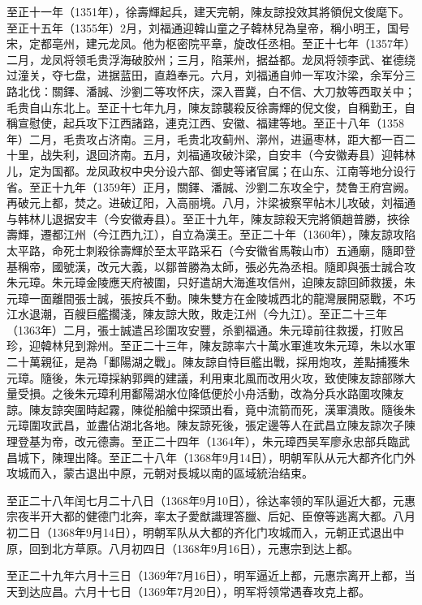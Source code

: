 至正十一年（1351年），徐壽輝起兵，建天完朝，陳友諒投效其將領倪文俊麾下。至正十五年（1355年）2月，刘福通迎韓山童之子韓林兒為皇帝，稱小明王，国号宋，定都亳州，建元龙凤。他为枢密院平章，旋改任丞相。至正十七年（1357年）二月，龙凤将领毛贵浮海破胶州；三月，陷莱州，据益都。龙凤将领李武、崔德绕过潼关，夺七盘，进据蓝田，直趋奉元。六月，刘福通自帅一军攻汴梁，余军分三路北伐：關鐸、潘誠、沙劉二等攻怀庆，深入晋冀，白不信、大刀敖等西取关中；毛贵自山东北上。至正十七年九月，陳友諒襲殺反徐壽輝的倪文俊，自稱勤王，自稱宣慰使，起兵攻下江西諸路，連克江西、安徽、福建等地。至正十八年（1358年）二月，毛贵攻占济南。三月，毛贵北攻蓟州、漷州，进逼枣林，距大都一百二十里，战失利，退回济南。五月，刘福通攻破汴梁，自安丰（今安徽寿县）迎韩林儿，定为国都。龙凤政权中央分设六部、御史等诸官属；在山东、江南等地分设行省。至正十九年（1359年）正月，關鐸、潘誠、沙劉二东攻全宁，焚鲁王府宫阙。再破元上都，焚之。进破辽阳，入高丽境。八月，汴梁被察罕帖木儿攻破，刘福通与韩林儿退据安丰（今安徽寿县）。至正十九年，陳友諒殺天完將領趙普勝，挾徐壽輝，遷都江州（今江西九江），自立為漢王。至正二十年（1360年），陳友諒攻陷太平路，命死士刺殺徐壽輝於至太平路采石（今安徽省馬鞍山市）五通廟，隨即登基稱帝，國號漢，改元大義，以鄒普勝為太師，張必先為丞相。隨即與張士誠合攻朱元璋。朱元璋金陵應天府被圍，只好遣胡大海進攻信州，迫陳友諒回師救援，朱元璋一面離間張士誠，張按兵不動。陳朱雙方在金陵城西北的龍灣展開惡戰，不巧江水退潮，百艘巨艦擱淺，陳友諒大敗，敗走江州（今九江）。至正二十三年（1363年）二月，張士誠遣呂珍圍攻安豐，杀劉福通。朱元璋前往救援，打败呂珍，迎韓林兒到滁州。至正二十三年，陳友諒率六十萬水軍進攻朱元璋，朱以水軍二十萬親征，是為「鄱陽湖之戰」。陳友諒自恃巨艦出戰，採用炮攻，差點捕獲朱元璋。隨後，朱元璋採納郭興的建議，利用東北風而改用火攻，致使陳友諒部隊大量受損。之後朱元璋利用鄱陽湖水位降低便於小舟活動，改為分兵水路圍攻陳友諒。陳友諒突圍時起霧，陳從船艙中探頭出看，竟中流箭而死，漢軍潰敗。隨後朱元璋圍攻武昌，並盡佔湖北各地。陳友諒死後，張定邊等人在武昌立陳友諒次子陳理登基为帝，改元德壽。至正二十四年（1364年），朱元璋西吴军廖永忠部兵臨武昌城下，陳理出降。至正二十八年（1368年9月14日），明朝军队从元大都齐化门外攻城而入，蒙古退出中原，元朝对長城以南的區域統治结束。

至正二十八年闰七月二十八日（1368年9月10日），徐达率领的军队逼近大都，元惠宗夜半开大都的健德门北奔，率太子愛猷識理答臘、后妃、臣僚等逃离大都。八月初二日（1368年9月14日），明朝军队从大都的齐化门攻城而入，元朝正式退出中原，回到北方草原。八月初四日（1368年9月16日），元惠宗到达上都。

至正二十九年六月十三日（1369年7月16日），明军逼近上都，元惠宗离开上都，当天到达应昌。六月十七日（1369年7月20日），明军将领常遇春攻克上都。

